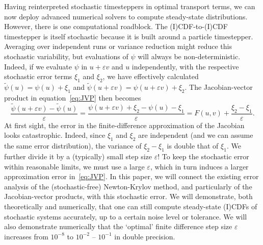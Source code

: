 \documentclass{article}
\begin{document}
Having reinterpreted stochastic timesteppers in optimal transport terms, we can now deploy advanced numerical solvers to compute steady-state distributions. However, there is one computational roadblock. The (I)CDF-to-(I)CDF timestepper is itself stochastic because it is built around a particle timestepper. Averaging over independent runs or variance reduction might reduce this stochastic variability, but evaluations of $\psi$ will always be non-deterministic. Indeed, if we evaluate $\psi$ in $u + \varepsilon v$ and $u$ independently, with the respective stochastic error terms $\xi_1$ and $\xi_2$, we have effectively calculated $\tilde{\psi}(u) = \psi(u) + \xi_1$ and $\tilde{\psi}(u + \varepsilon v) = \psi(u+ \varepsilon v) + \xi_2$. The Jacobian-vector product in equation~\eqref{eq:JVP} then becomes
\begin{equation} \frac{\tilde{\psi}(u+\varepsilon v) - \tilde{\psi}(u)}{\varepsilon} = \frac{\psi(u+\varepsilon v) + \xi_2 - \psi(u) - \xi_1}{\varepsilon} = F(u, v) + \frac{\xi_2 - \xi_1}{\varepsilon}.
\end{equation}
At first sight, the error in the finite-difference approximation of the Jacobian looks catastrophic. Indeed, since $\xi_1$ and $\xi_2$ are independent (and we can assume the same error distribution), the variance of $\xi_2-\xi_1$ is double that of $\xi_1$. We further divide it by a (typically) small step size $\varepsilon$! To keep the stochastic error within reasonable limits, we must use a large $\varepsilon$, which in turn induces a larger approximation error in~\eqref{eq:JVP}. In this paper, we will connect the existing error analysis of the (stochastic-free) Newton-Krylov method, and particularly of the Jacobian-vector products, with this stochastic error. We will demonstrate, both theoretically and numerically, that one can still compute steady-state (I)CDFs of stochastic systems accurately, up to a certain noise level or tolerance. We will also demonstrate numerically that the `optimal' finite difference step size $\varepsilon$ increases from $10^{-8}$ to $10^{-2}$ -- $10^{-1}$ in double precision.
\end{document}
